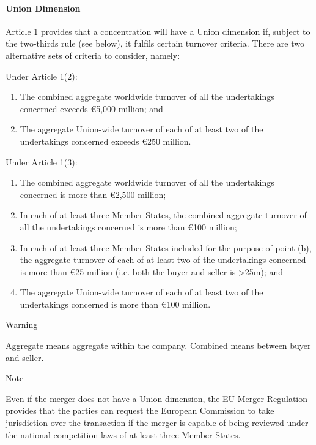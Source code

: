 \documentclass[
]{article}
\providecommand{\tightlist}{%
  \setlength{\itemsep}{0pt}\setlength{\parskip}{0pt}}
\begin{document}
\hypertarget{union-dimension}{%
\paragraph{Union Dimension}\label{union-dimension}}

Article 1 provides that a concentration will have a Union dimension if,
subject to the two-thirds rule (see below), it fulfils certain turnover
criteria. There are two alternative sets of criteria to consider,
namely:

Under Article 1(2):

\begin{enumerate}
\tightlist
\item
  The combined aggregate worldwide turnover of all the undertakings
  concerned exceeds €5,000 million; and
\item
  The aggregate Union-wide turnover of each of at least two of the
  undertakings concerned exceeds €250 million.
\end{enumerate}

Under Article 1(3):

\begin{enumerate}
\tightlist
\item
  The combined aggregate worldwide turnover of all the undertakings
  concerned is more than €2,500 million;
\item
  In each of at least three Member States, the combined aggregate
  turnover of all the undertakings concerned is more than €100 million;
\item
  In each of at least three Member States included for the purpose of
  point (b), the aggregate turnover of each of at least two of the
  undertakings concerned is more than €25 million (i.e. both the buyer
  and seller is \textgreater25m); and
\item
  The aggregate Union-wide turnover of each of at least two of the
  undertakings concerned is more than €100 million.
\end{enumerate}

Warning

Aggregate means aggregate within the company. Combined means between
buyer and seller.

Note

Even if the merger does not have a Union dimension, the EU Merger
Regulation provides that the parties can request the European Commission
to take jurisdiction over the transaction if the merger is capable of
being reviewed under the national competition laws of at least three
Member States.
\end{document}
